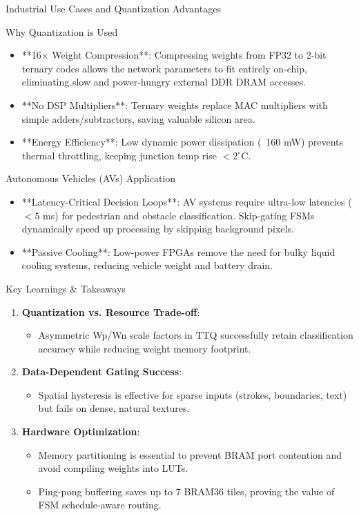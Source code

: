 \documentclass{beamer}
\begin{document}
\begin{frame}{Industrial Use Cases and Quantization Advantages}
\begin{block}{Why Quantization is Used}
\begin{itemize}
    \item **16$\times$ Weight Compression**: Compressing weights from FP32 to 2-bit ternary codes allows the network parameters to fit entirely on-chip, eliminating slow and power-hungry external DDR DRAM accesses.
    \item **No DSP Multipliers**: Ternary weights replace MAC multipliers with simple adders/subtractors, saving valuable silicon area.
    \item **Energy Efficiency**: Low dynamic power dissipation (~160 mW) prevents thermal throttling, keeping junction temp rise $<2^\circ$C.
\end{itemize}
\end{block}

\begin{block}{Autonomous Vehicles (AVs) Application}
\begin{itemize}
    \item **Latency-Critical Decision Loops**: AV systems require ultra-low latencies ($<5$ ms) for pedestrian and obstacle classification. Skip-gating FSMs dynamically speed up processing by skipping background pixels.
    \item **Passive Cooling**: Low-power FPGAs remove the need for bulky liquid cooling systems, reducing vehicle weight and battery drain.
\end{itemize}
\end{block}
\end{frame}

\begin{frame}{Key Learnings & Takeaways}
\begin{enumerate}
    \item \textbf{Quantization vs. Resource Trade-off}:
    \begin{itemize}
        \item Asymmetric Wp/Wn scale factors in TTQ successfully retain classification accuracy while reducing weight memory footprint.
    \end{itemize}
    \item \textbf{Data-Dependent Gating Success}:
    \begin{itemize}
        \item Spatial hysteresis is effective for sparse inputs (strokes, boundaries, text) but fails on dense, natural textures.
    \end{itemize}
    \item \textbf{Hardware Optimization}:
    \begin{itemize}
        \item Memory partitioning is essential to prevent BRAM port contention and avoid compiling weights into LUTs.
        \item Ping-pong buffering saves up to 7 BRAM36 tiles, proving the value of FSM schedule-aware routing.
    \end{itemize}
\end{enumerate}
\end{frame}
\end{document}
